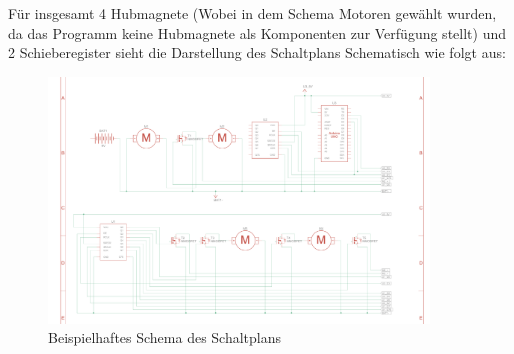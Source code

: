 Für insgesamt 4 Hubmagnete (Wobei in dem Schema Motoren gewählt wurden, da das Programm keine Hubmagnete als Komponenten
zur Verfügung stellt) und 2 Schieberegister sieht die Darstellung des Schaltplans Schematisch wie folgt aus:

\begin{figure}[htbp]
	\centering
	\includegraphics[width=0.9\textwidth]{img/SchematischeSchaltungExp}
	\caption{Beispielhaftes Schema des Schaltplans}
	\label{img:SchaltungExpSchema}
\end{figure}


